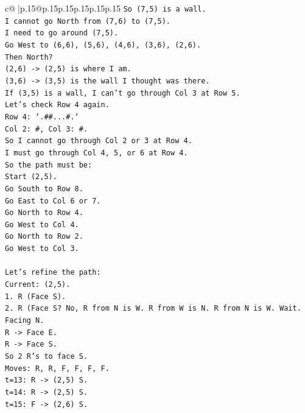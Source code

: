 \documentclass{article}
\begin{document}
{\begin{supertabular}{c@{$\;$}|p{.15\linewidth}@{}p{.15\linewidth}p{.15\linewidth}p{.15\linewidth}p{.15\linewidth}p{.15\linewidth}}
{{{\texttt{So (7,5) is a wall.} \\
\texttt{I cannot go North from (7,6) to (7,5).} \\
\texttt{I need to go around (7,5).} \\
\texttt{Go West to (6,6), (5,6), (4,6), (3,6), (2,6).} \\
\texttt{Then North?} \\
\texttt{(2,6) {-}> (2,5) is where I am.} \\
\texttt{(3,6) {-}> (3,5) is the wall I thought was there.} \\
\texttt{If (3,5) is a wall, I can't go through Col 3 at Row 5.} \\
\texttt{Let's check Row 4 again.} \\
\texttt{Row 4: `.\#\#...\#.`} \\
\texttt{Col 2: \#, Col 3: \#.} \\
\texttt{So I cannot go through Col 2 or 3 at Row 4.} \\
\texttt{I must go through Col 4, 5, or 6 at Row 4.} \\
\texttt{So the path must be:} \\
\texttt{Start (2,5).} \\
\texttt{Go South to Row 8.} \\
\texttt{Go East to Col 6 or 7.} \\
\texttt{Go North to Row 4.} \\
\texttt{Go West to Col 4.} \\
\texttt{Go North to Row 2.} \\
\texttt{Go West to Col 3.} \\
\\ 
\texttt{Let's refine the path:} \\
\texttt{Current: (2,5).} \\
\texttt{1. R (Face S).} \\
\texttt{2. R (Face S? No, R from N is W. R from W is N. R from N is W. Wait.} \\
\texttt{Facing N.} \\
\texttt{R {-}> Face E.} \\
\texttt{R {-}> Face S.} \\
\texttt{So 2 R's to face S.} \\
\texttt{Moves: R, R, F, F, F, F.} \\
\texttt{t=13: R {-}> (2,5) S.} \\
\texttt{t=14: R {-}> (2,5) S.} \\
\texttt{t=15: F {-}> (2,6) S.} \\
}}}
\end{supertabular}}
\end{document}
